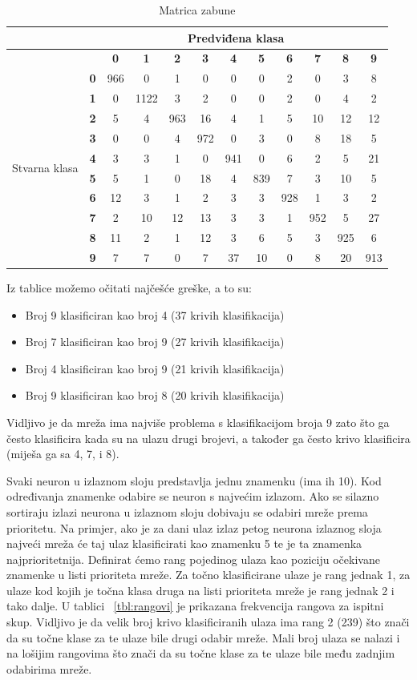 \documentclass[times, utf8, zavrsni, numeric]{fer}
\begin{document}
\begin{table}
\caption{Matrica zabune}
\label{tbl:matrica-zabune}
\centering
\begin{tabular}{|c|c|c|c|c|c|c|c|c|c|c|c|} \hline
&\multicolumn{11}{|c|}{Predviđena klasa} \\ \hline
&&\textbf{0}&\textbf{1}&\textbf{2}&\textbf{3}&\textbf{4}&\textbf{5}&\textbf{6}&\textbf{7}&\textbf{8}&\textbf{9	}\\ \hline
\multirow{11}{*}{Stvarna klasa}
&\textbf{0}&966&0&1&0&0&0&2&0&3&8 \\
&\textbf{1}&0&1122&3&2&0&0&2&0&4&2 \\
&\textbf{2}&5&4&963&16&4&1&5&10&12&12 \\
&\textbf{3}&0&0&4&972&0&3&0&8&18&5 \\
&\textbf{4}&3&3&1&0&941&0&6&2&5&21 \\
&\textbf{5}&5&1&0&18&4&839&7&3&10&5 \\
&\textbf{6}&12&3&1&2&3&3&928&1&3&2 \\
&\textbf{7}&2&10&12&13&3&3&1&952&5&27 \\
&\textbf{8}&11&2&1&12&3&6&5&3&925&6 \\
&\textbf{9}&7&7&0&7&37&10&0&8&20&913 \\ \hline
\end{tabular}
\end{table}

Iz tablice možemo očitati najčešće greške, a to su:
\begin{itemize}
\item Broj 9 klasificiran kao broj 4 (37 krivih klasifikacija)
\item Broj 7 klasificiran kao broj 9 (27 krivih klasifikacija)
\item Broj 4 klasificiran kao broj 9 (21 krivih klasifikacija)
\item Broj 9 klasificiran kao broj 8 (20 krivih klasifikacija)
\end{itemize}

Vidljivo je da mreža ima najviše problema s klasifikacijom broja 9 zato što ga često klasificira kada su na ulazu drugi brojevi, a također ga često krivo klasificira (miješa ga sa 4, 7, i 8).

Svaki neuron u izlaznom sloju predstavlja jednu znamenku (ima ih 10). Kod određivanja znamenke odabire se neuron s najvećim izlazom. Ako se silazno sortiraju izlazi neurona u izlaznom sloju dobivaju se odabiri mreže prema prioritetu. Na primjer, ako je za dani ulaz izlaz petog neurona izlaznog sloja najveći mreža će taj ulaz klasificirati kao znamenku 5 te je ta znamenka najprioritetnija. Definirat ćemo rang pojedinog ulaza kao poziciju očekivane znamenke u listi prioriteta mreže. Za točno klasificirane ulaze je rang jednak 1, za ulaze kod kojih je točna klasa druga na listi prioriteta mreže je rang jednak 2 i tako dalje. U tablici ~\ref{tbl:rangovi} je prikazana frekvencija rangova za ispitni skup. Vidljivo je da velik broj krivo klasificiranih ulaza ima rang 2 (239) što znači da su točne klase za te ulaze bile drugi odabir mreže. Mali broj ulaza se nalazi i na lošijim rangovima što znači da su točne klase za te ulaze bile među zadnjim odabirima mreže.
\end{document}
